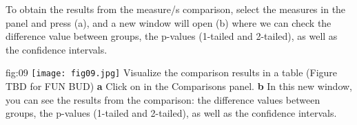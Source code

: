 \documentclass[justified]{tufte-handout}
\begin{document}
To obtain the results from the measure/s comparison, select the measures in the  panel and press ({a}), and a new window will open ({b}) where we can check the difference value between groups, the p-values (1-tailed and 2-tailed), as well as the confidence intervals.

	{fig:09}
	{
	\texttt{[image: fig09.jpg]}
	}
	{Visualize the comparison results in a table (Figure TBD for FUN BUD)}
	{
	{\bf a} Click on  in the Comparisons panel.
	{\bf b} In this new window, you can see the results from the comparison: the difference values between groups, the p-values (1-tailed and 2-tailed), as well as the confidence intervals.
	}
\end{document}
